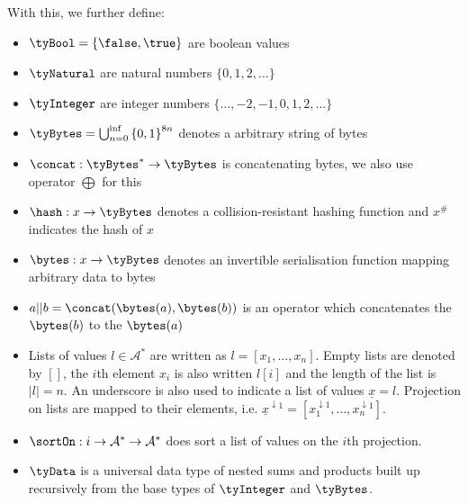 \noindent With this, we further define:
\begin{itemize}
	\item $\tyBool = \{\false, \true\}$ are boolean values
	\item $\tyNatural$ are natural numbers $\{0, 1, 2, \ldots\}$
	\item $\tyInteger$ are integer numbers $\{\ldots, -2, -1, 0, 1, 2, \ldots\}$
	\item $\tyBytes = \bigcup_{n=0}^{\inf}{\{0,1\}}^{8n}$ denotes a arbitrary
	      string of bytes
	\item $\concat : \tyBytes^* \to \tyBytes$ is concatenating bytes, we also use operator $\bigoplus$ for this
	\item $\hash : x \to \tyBytes$ denotes a collision-resistant
	      hashing function and $x^{\#}$ indicates the hash of $x$
	\item $\bytes : x \to \tyBytes$ denotes an invertible serialisation function
	      mapping arbitrary data to bytes
	\item $a || b = \concat(\bytes(a), \bytes(b))$ is an operator which concatenates the $\bytes(b)$ to the $\bytes(a)$
	\item Lists of values $l \in \mathcal{A}^{*}$ are written as
	      $l = [x_{1}, \ldots, x_{n}]$. Empty lists are denoted by $[]$, the $i$th
	      element $x_{i}$ is also written $l[i]$ and the length of the list is
	      $|l| = n$. An underscore is also used to indicate a list of values
	      $\underline{x} = l$. Projection on lists are mapped to their elements,
	      i.e.
	      $\underline{x}^{\downarrow1} = [x_{1}^{\downarrow1}, \dots, x_{n}^{\downarrow1}]$.
	\item $\sortOn : i \to \mathcal{A}^{*} \to \mathcal{A}^{*}$ does sort a list of
	      values on the $i$th projection.
	\item $\tyData$ is a universal data type of nested sums and products built up
	      recursively from the base types of $\tyInteger$ and $\tyBytes$.
\end{itemize}

